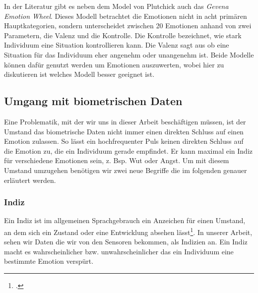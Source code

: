 In der Literatur gibt es neben dem Model von Plutchick auch das \textit{Gevena Emotion Wheel}. Dieses Modell betrachtet die Emotionen nicht in acht primären Hauptkategorien, sondern unterscheidet zwischen 20 Emotionen anhand von zwei Parametern, die Valenz und die Kontrolle. Die Kontrolle bezeichnet, wie stark Individuum eine Situation kontrollieren kann. Die Valenz sagt aus ob eine Situation für das Individuum eher angenehm oder unangenehm ist.\newline 
Beide Modelle können dafür genutzt werden um Emotionen auszuwerten, wobei hier zu diskutieren ist welches Modell besser geeignet ist.
\subsection{Umgang mit biometrischen Daten}
Eine Problematik, mit der wir uns in dieser Arbeit beschäftigen müssen, ist der Umstand das biometrische Daten nicht immer einen direkten Schluss auf einen Emotion zulassen. So lässt ein hochfrequenter Puls keinen direkten Schluss auf die Emotion zu, die ein Individuum gerade empfindet. Er kann maximal ein Indiz für verschiedene Emotionen sein, z. Bsp. Wut oder Angst. Um mit diesem Umstand umzugehen benötigen wir zwei neue Begriffe die im folgenden genauer erläutert werden. 
\subsubsection{Indiz}
Ein Indiz ist im allgemeinen Sprachgebrauch ein Anzeichen für einen Umstand, an dem sich ein Zustand oder eine Entwicklung absehen lässt\footcite[Vgl.][]{Dud18}. In unserer Arbeit, sehen wir Daten die wir von den Sensoren bekommen, als Indizien an. Ein Indiz macht es wahrscheinlicher bzw. unwahrscheinlicher das ein Individuum eine bestimmte Emotion verspürt. 
